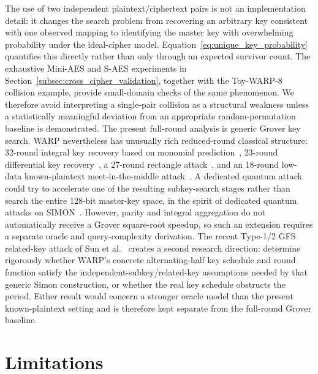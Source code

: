 \documentclass[pdflatex,sn-nature]{sn-jnl}
\theoremstyle{thmstyleone}
\theoremstyle{thmstyletwo}
\begin{document}
The use of two independent plaintext/ciphertext pairs is not an implementation detail: it changes the search problem from recovering an arbitrary key consistent with one observed mapping to identifying the master key with overwhelming probability under the ideal-cipher model.  Equation~\eqref{eq:unique_key_probability} quantifies this directly rather than only through an expected survivor count.  The exhaustive Mini-AES and S-AES experiments in Section~\ref{subsec:cross_cipher_validation}, together with the Toy-WARP-8 collision example, provide small-domain checks of the same phenomenon.  We therefore avoid interpreting a single-pair collision as a structural weakness unless a statistically meaningful deviation from an appropriate random-permutation baseline is demonstrated.
The present full-round analysis is generic Grover key search. WARP nevertheless has unusually rich reduced-round classical structure: 32-round integral key recovery based on monomial prediction~\cite{Hadipour2022}, 23-round differential key recovery~\cite{Teh2022}, a 27-round rectangle attack~\cite{Zeng2025}, and an 18-round low-data known-plaintext meet-in-the-middle attack~\cite{Vaziri2026}. A dedicated quantum attack could try to accelerate one of the resulting subkey-search stages rather than search the entire 128-bit master-key space, in the spirit of dedicated quantum attacks on SIMON~\cite{LiuYang2020}. However, parity and integral aggregation do not automatically receive a Grover square-root speedup, so such an extension requires a separate oracle and query-complexity derivation.
The recent Type-1/2 GFS related-key attack of Sun et al.~\cite{Sun2026} creates a second research direction: determine rigorously whether WARP's concrete alternating-half key schedule and round function satisfy the independent-subkey/related-key assumptions needed by that generic Simon construction, or whether the real key schedule obstructs the period. Either result would concern a stronger oracle model than the present known-plaintext setting and is therefore kept separate from the full-round Grover baseline.

\section{Limitations}
\label{sec:limitations}
\end{document}
